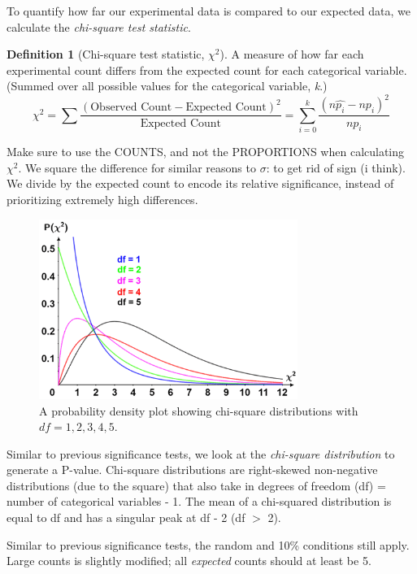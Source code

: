 \documentclass[12pt, a4paper]{article}
\theoremstyle{definition}
\newtheorem{definition}{Definition}
\begin{document}
To quantify how far our experimental data is compared to our expected data, we calculate the \textit{chi-square test statistic}.

\begin{definition}[Chi-square test statistic, $\chi^2$]
    A measure of how far each experimental count differs from the expected count for each categorical variable. (Summed over all possible values for the categorical variable, \textit{k}.)
    \[\chi^2 = \sum \frac{(\textrm{Observed Count} - \textrm{Expected Count})^2}{\textrm{Expected Count}} 
                = \sum_{i=0}^{k} \frac{(n\hat{p_i} - np_i)^2}{np_i}\]
\end{definition}

Make sure to use the COUNTS, and not the PROPORTIONS when calculating $\chi^2$.
We square the difference for similar reasons to $\sigma$: to get rid of sign (i think).
We divide by the expected count to encode its relative significance, instead of prioritizing extremely high differences.

\begin{figure}[t]
    \centering
    \includegraphics[width=0.75\textwidth]{chi-square-distribution.png}
    \caption{A probability density plot showing chi-square distributions with $df = 1, 2, 3, 4, 5$.}
    \label{fig:chi-square-dist}
\end{figure}

Similar to previous significance tests, we look at the \textit{chi-square distribution} to generate a P-value.
Chi-square distributions are right-skewed non-negative distributions (due to the square) that also take in degrees of freedom (df) = number of categorical variables - 1.
The mean of a chi-squared distribution is equal to df and has a singular peak at df - 2 (df $>$ 2).

Similar to previous significance tests, the random and 10\% conditions still apply.
Large counts is slightly modified; all \textit{expected} counts should at least be 5.
\end{document}
